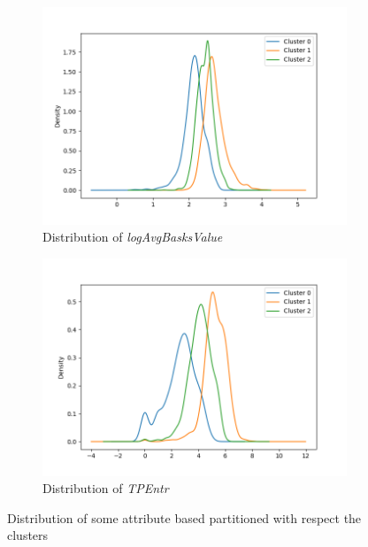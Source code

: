 \begin{figure}[h!]
\begin{subfigure}{0.49\textwidth}
    \end{subfigure}
        \begin{subfigure}{0.49\textwidth}
        \centering
        \includegraphics[width=\linewidth]{img/clust_1/logavgbv_km.png}
        \caption{Distribution of \emph{logAvgBasksValue}}
        \label{fig:logavgbv}
    \end{subfigure}
        \begin{subfigure}{0.49\textwidth}
        \centering
        \includegraphics[width=\linewidth]{img/clust_1/tp_entr_km.png}
        \caption{Distribution of \emph{TPEntr}}
        \label{fig:tpentr}
    \end{subfigure}
    \caption{Distribution of some attribute based partitioned with respect the clusters}
\end{figure}
\newpage
